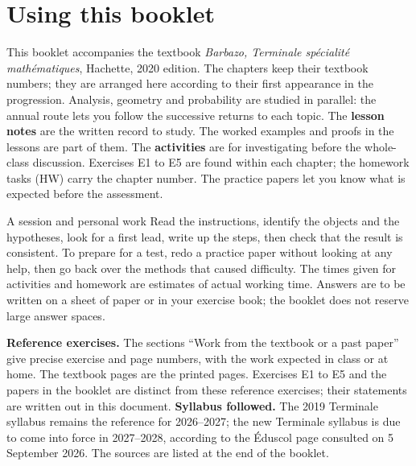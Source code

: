 \chapter*{Using this booklet}
This booklet accompanies the textbook \emph{Barbazo, Terminale spécialité mathématiques}, Hachette, 2020 edition. The chapters keep their textbook numbers; they are arranged here according to their first appearance in the progression. Analysis, geometry and probability are studied in parallel: the annual route lets you follow the successive returns to each topic.
The \textbf{lesson notes} are the written record to study. The worked examples and proofs in the lessons are part of them. The \textbf{activities} are for investigating before the whole-class discussion. Exercises E1 to E5 are found within each chapter; the homework tasks (HW) carry the chapter number. The practice papers let you know what is expected before the assessment.
\begin{retenir}{A session and personal work}
Read the instructions, identify the objects and the hypotheses, look for a first lead, write up the steps, then check that the result is consistent. To prepare for a test, redo a practice paper without looking at any help, then go back over the methods that caused difficulty.
The times given for activities and homework are estimates of actual working time. Answers are to be written on a sheet of paper or in your exercise book; the booklet does not reserve large answer spaces.
\end{retenir}
\textbf{Reference exercises.} The sections ``Work from the textbook or a past paper'' give precise exercise and page numbers, with the work expected in class or at home. The textbook pages are the printed pages. Exercises E1 to E5 and the papers in the booklet are distinct from these reference exercises; their statements are written out in this document.
\textbf{Syllabus followed.} The 2019 Terminale syllabus remains the reference for 2026--2027; the new Terminale syllabus is due to come into force in 2027--2028, according to the Éduscol page consulted on 5 September 2026. The sources are listed at the end of the booklet.
\ifprof
\clearpage
